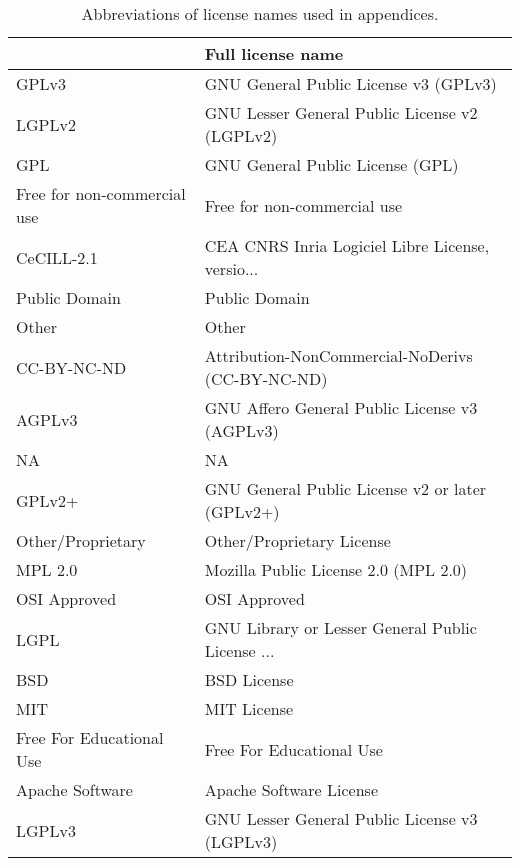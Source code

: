 \begin{table}
\centering
\caption{Abbreviations of license names used in appendices.}
\label{tab:keys-licenses}
\begin{tabular}{ll}
\toprule
{} &                                  Full license name \\
\midrule
GPLv3                        &              GNU General Public License v3 (GPLv3) \\
LGPLv2                       &      GNU Lesser General Public License v2 (LGPLv2) \\
GPL                          &                   GNU General Public License (GPL) \\
 Free for non-commercial use &                        Free for non-commercial use \\
CeCILL-2.1                   &   CEA CNRS Inria Logiciel Libre License, versio... \\
 Public Domain               &                                      Public Domain \\
 Other                       &                                              Other \\
CC-BY-NC-ND                  &   Attribution-NonCommercial-NoDerivs (CC-BY-NC-ND) \\
AGPLv3                       &      GNU Affero General Public License v3 (AGPLv3) \\
 NA                          &                                                 NA \\
GPLv2+                       &    GNU General Public License v2 or later (GPLv2+) \\
 Other/Proprietary           &                          Other/Proprietary License \\
MPL 2.0                      &               Mozilla Public License 2.0 (MPL 2.0) \\
 OSI Approved                &                                       OSI Approved \\
LGPL                         &   GNU Library or Lesser General Public License ... \\
 BSD                         &                                        BSD License \\
 MIT                         &                                        MIT License \\
 Free For Educational Use    &                           Free For Educational Use \\
 Apache Software             &                            Apache Software License \\
LGPLv3                       &      GNU Lesser General Public License v3 (LGPLv3) \\
\bottomrule
\end{tabular}
\end{table}

